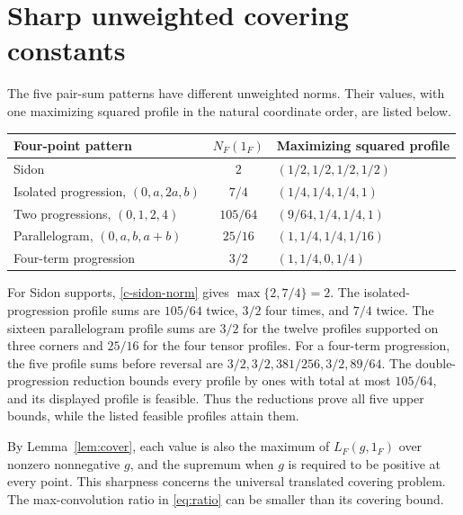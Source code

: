 \section{Sharp unweighted covering constants}
\label{sec:constants}

The five pair-sum patterns have different unweighted norms.  Their values,
with one maximizing squared profile in the natural coordinate order, are
listed below.
\begin{center}
\begin{tabular}{lcl}
\toprule
Four-point pattern & $N_F(1_F)$ & Maximizing squared profile \\
\midrule
Sidon & $2$ & $(1/2,1/2,1/2,1/2)$ \\
Isolated progression, $(0,a,2a,b)$ & $7/4$ & $(1/4,1/4,1/4,1)$ \\
Two progressions, $(0,1,2,4)$ & $105/64$ & $(9/64,1/4,1/4,1)$ \\
Parallelogram, $(0,a,b,a+b)$ & $25/16$ & $(1,1/4,1/4,1/16)$ \\
Four-term progression & $3/2$ & $(1,1/4,0,1/4)$ \\
\bottomrule
\end{tabular}
\end{center}

For Sidon supports, \eqref{c-sidon-norm} gives
$\max\{2,7/4\}=2$.  The isolated-progression profile sums are
$105/64$ twice, $3/2$ four times, and $7/4$ twice.  The sixteen
parallelogram profile sums are $3/2$ for the twelve profiles supported
on three corners and $25/16$ for the four tensor profiles.  For a
four-term progression, the five profile sums before reversal are
$3/2,3/2,381/256,3/2,89/64$.  The double-progression reduction bounds
every profile by ones with total at most $105/64$, and its displayed
profile is feasible.  Thus the reductions prove all five upper bounds,
while the listed feasible profiles attain them.

By Lemma~\ref{lem:cover}, each value is also the maximum of
$L_F(g,1_F)$ over nonzero nonnegative $g$, and the supremum when $g$
is required to be positive at every point.  This sharpness concerns the
universal translated covering problem.  The max-convolution ratio in
\eqref{eq:ratio} can be smaller than its covering bound.

